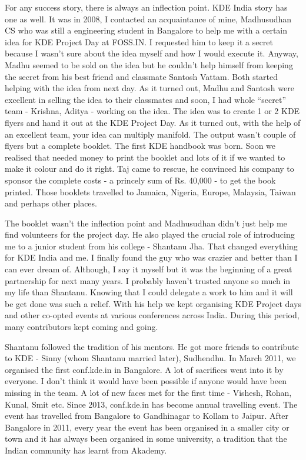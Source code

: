 For any success story, there is always an inflection point. KDE India story has one as well. It was in 2008, I contacted an acquaintance of mine, Madhusudhan CS who was still a engineering student in Bangalore to help me with a certain idea for KDE Project Day at FOSS.IN. I requested him to keep it a secret because I wasn’t sure about the idea myself and how I would execute it. Anyway, Madhu seemed to be sold on the idea but he couldn’t help himself from keeping the secret from his best friend and classmate Santosh Vattam. Both started helping with the idea from next day. As it turned out, Madhu and Santosh were excellent in selling the idea to their classmates and soon, I had whole “secret” team - Krishna, Aditya - working on the idea. The idea was to create 1 or 2 KDE flyers and hand it out at the KDE Project Day. As it turned out, with the help of an excellent team, your idea can multiply manifold. The output wasn’t couple of flyers but a complete booklet. The first KDE handbook was born. Soon we realised that needed money to print the booklet and lots of it if we wanted to make it colour and do it right. Taj came to rescue, he convinced his company to sponsor the complete costs - a princely sum of Rs. 40,000 - to get the book printed. Those booklets travelled to Jamaica, Nigeria, Europe, Malaysia, Taiwan and perhaps other places.

The booklet wasn’t the inflection point and Madhusudhan didn’t just help me find volunteers for the project day. He also played the crucial role of introducing me to a junior student from his college - Shantanu Jha. That changed everything for KDE India and me. I finally found the guy who was crazier and better than I can ever dream of. Although, I say it myself but it was the beginning of a great partnership for next many years. I probably haven’t trusted anyone so much in my life than Shantanu. Knowing that I could delegate a work to him and it will be get done was such a relief. With his help we kept organising KDE Project days and other co-opted events at various conferences across India. During this period, many contributors kept coming and going.

Shantanu followed the tradition of his mentors. He got more friends to contribute to KDE - Sinny (whom Shantanu married later), Sudhendhu. In March 2011, we organised the first conf.kde.in in Bangalore. A lot of sacrifices went into it by everyone. I don’t think it would have been possible if anyone would have been missing in the team. A lot of new faces met for the first time - Vishesh, Rohan, Kunal, Smit etc. Since 2013, conf.kde.in has become annual travelling event. The event has travelled from Bangalore to Gandhinagar to Kollam to Jaipur. After Bangalore in 2011, every year the event has been organised in a smaller city or town and it has always been organised in some university, a tradition that the Indian community has learnt from Akademy.

